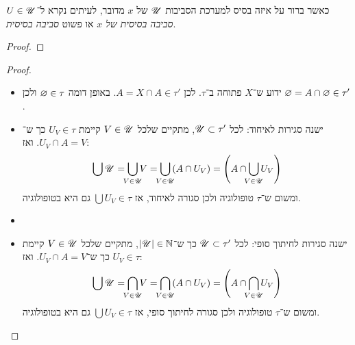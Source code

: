 \documentclass[name=רשימות טופולוגיה כללית]{../../../tex/classes/noChapterMegasumPreamble}
\begin{document}
	כאשר ברור על איזה בסיס למערכת הסביבות $\mathscr{U}$ של $x$ מדובר, לעיתים נקרא ל־$U \in \mathscr{U}$ \textit{סביבה בסיסית של $x$} או פשוט \textit{סביבה בסיסית}. 
	\begin{proof}
	\end{proof}
	
	\begin{proof}
		\begin{itemize}
			\item ידוע ש־$X$ פתוחה ב־$\tau$. לכן $A = X \cap A \in \tau'$. באופן דומה $\varnothing \in \tau$ ולכן $\varnothing = A \cap \varnothing \in \tau'$. 
			\item ישנה סגירות לאיחוד: לכל $\mathscr{U} \subset \tau'$, מתקיים שלכל $V \in \mathscr{U}$ קיימת $U_V \in \tau$ כך ש־$U_V \cap A = V$. ואז: 
			\[ \bigcup \UU = \bigcup_{\mathclap{V \in \UU}}V = \bigcup_{\mathclap{V \in \UU}}\cl{A \cap U_V} = \cl{A \cap \bigcup_{\mathclap{V \in \UU}}U_V} \]
			ומשום ש־$\tau$ טופולוגיה ולכן סגורה לאיחוד, אז $\bigcup U_V \in \tau$ גם היא בטופולוגיה. 
			\item \item ישנה סגירות לחיתוך סופי: לכל $\mathscr{U} \subset \tau'$ כך ש־$\left \lvert \mathscr{U} \right \rvert \in \mathbb{N}$, מתקיים שלכל $V \in \mathscr{U}$ קיימת $U_V \in \tau$ כך ש־$U_V \cap A = V$. ואז: 
			\[ \bigcup \UU = \bigcap_{\mathclap{V \in \UU}}V = \bigcap_{\mathclap{V \in \UU}}\cl{A \cap U_V} = \cl{A \cap \bigcap_{\mathclap{V \in \UU}}U_V} \]
			ומשום ש־$\tau$ טופולוגיה ולכן סגורה לחיתוך סופי, אז $\bigcup U_V \in \tau$ גם היא בטופולוגיה. 
		\end{itemize}\envendproof
	\end{proof}
	
\end{document}
